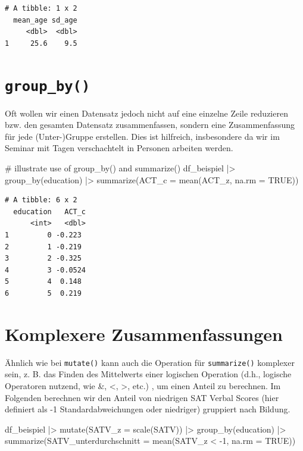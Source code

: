 \documentclass[
  letterpaper,
  DIV=11,
  numbers=noendperiod]{scrreprt}
\newenvironment{Shaded}{\begin{snugshade}}{\end{snugshade}}
\newcommand{\AttributeTok}[1]{\textcolor[rgb]{0.40,0.45,0.13}{#1}}
\newcommand{\CommentTok}[1]{\textcolor[rgb]{0.37,0.37,0.37}{#1}}
\newcommand{\ConstantTok}[1]{\textcolor[rgb]{0.56,0.35,0.01}{#1}}
\newcommand{\DecValTok}[1]{\textcolor[rgb]{0.68,0.00,0.00}{#1}}
\newcommand{\FunctionTok}[1]{\textcolor[rgb]{0.28,0.35,0.67}{#1}}
\newcommand{\NormalTok}[1]{\textcolor[rgb]{0.00,0.23,0.31}{#1}}
\newcommand{\SpecialCharTok}[1]{\textcolor[rgb]{0.37,0.37,0.37}{#1}}
\begin{document}
\begin{verbatim}
# A tibble: 1 x 2
  mean_age sd_age
     <dbl>  <dbl>
1     25.6    9.5
\end{verbatim}

\section{\texorpdfstring{\texttt{group\_by()}}{group\_by()}}\label{group_by}

Oft wollen wir einen Datensatz jedoch nicht auf eine einzelne Zeile
reduzieren bzw. den gesamten Datensatz zusammenfassen, sondern eine
Zusammenfassung für jede (Unter-)Gruppe erstellen. Dies ist hilfreich,
insbesondere da wir im Seminar mit Tagen verschachtelt in Personen
arbeiten werden.

\begin{Shaded}
\begin{Highlighting}[]
\CommentTok{\# illustrate use of group\_by() and summarize()}
\NormalTok{df\_beispiel }\SpecialCharTok{|\textgreater{}} 
  \FunctionTok{group\_by}\NormalTok{(education) }\SpecialCharTok{|\textgreater{}} 
  \FunctionTok{summarize}\NormalTok{(}\AttributeTok{ACT\_c =} \FunctionTok{mean}\NormalTok{(ACT\_z, }\AttributeTok{na.rm =} \ConstantTok{TRUE}\NormalTok{))}
\end{Highlighting}
\end{Shaded}

\begin{verbatim}
# A tibble: 6 x 2
  education   ACT_c
      <int>   <dbl>
1         0 -0.223 
2         1 -0.219 
3         2 -0.325 
4         3 -0.0524
5         4  0.148 
6         5  0.219 
\end{verbatim}

\section{Komplexere
Zusammenfassungen}\label{komplexere-zusammenfassungen}

Ähnlich wie bei \texttt{mutate()} kann auch die Operation für
\texttt{summarize()} komplexer sein, z. B. das Finden des Mittelwerts
einer logischen Operation (d.h., logische Operatoren nutzend, wie \&,
\textless, \textgreater, \textbar{} etc.) , um einen Anteil zu
berechnen. Im Folgenden berechnen wir den Anteil von niedrigen SAT
Verbal Scores (hier definiert als -1 Standardabweichungen oder
niedriger) gruppiert nach Bildung.

\begin{Shaded}
\begin{Highlighting}[]
\NormalTok{df\_beispiel }\SpecialCharTok{|\textgreater{}} 
  \FunctionTok{mutate}\NormalTok{(}\AttributeTok{SATV\_z =} \FunctionTok{scale}\NormalTok{(SATV)) }\SpecialCharTok{|\textgreater{}} 
  \FunctionTok{group\_by}\NormalTok{(education) }\SpecialCharTok{|\textgreater{}}
  \FunctionTok{summarize}\NormalTok{(}\AttributeTok{SATV\_unterdurchschnitt =} \FunctionTok{mean}\NormalTok{(SATV\_z }\SpecialCharTok{\textless{}} \SpecialCharTok{{-}}\DecValTok{1}\NormalTok{, }\AttributeTok{na.rm =} \ConstantTok{TRUE}\NormalTok{))}
\end{Highlighting}
\end{Shaded}
\end{document}
